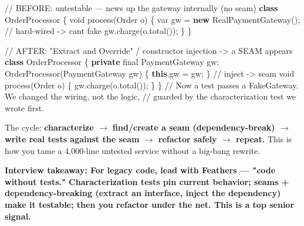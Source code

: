 \documentclass[11pt]{article}
\newenvironment{Shaded}{\begin{snugshade}}{\end{snugshade}}
\newcommand{\CommentTok}[1]{\textcolor[rgb]{0.48,0.49,0.49}{#1}}
\newcommand{\DataTypeTok}[1]{\textcolor[rgb]{0.16,0.50,0.73}{#1}}
\newcommand{\FunctionTok}[1]{\textcolor[rgb]{0.56,0.27,0.68}{#1}}
\newcommand{\KeywordTok}[1]{\textcolor[rgb]{0.81,0.81,0.76}{\textbf{#1}}}
\newcommand{\NormalTok}[1]{\textcolor[rgb]{0.81,0.81,0.76}{#1}}
\newcommand{\OperatorTok}[1]{\textcolor[rgb]{0.81,0.81,0.76}{#1}}
\begin{document}

\begin{Shaded}
\begin{Highlighting}[]
\CommentTok{// BEFORE: untestable — news up the gateway internally (no seam)}
\KeywordTok{class}\NormalTok{ OrderProcessor }\OperatorTok{\{}
    \DataTypeTok{void} \FunctionTok{process}\OperatorTok{(}\NormalTok{Order o}\OperatorTok{)} \OperatorTok{\{}
        \DataTypeTok{var}\NormalTok{ gw }\OperatorTok{=} \KeywordTok{new} \FunctionTok{RealPaymentGateway}\OperatorTok{();}   \CommentTok{// hard{-}wired {-}\textgreater{} can\textquotesingle{}t fake}
\NormalTok{        gw}\OperatorTok{.}\FunctionTok{charge}\OperatorTok{(}\NormalTok{o}\OperatorTok{.}\FunctionTok{total}\OperatorTok{());}
    \OperatorTok{\}}
\OperatorTok{\}}

\CommentTok{// AFTER: "Extract and Override" / constructor injection {-}\textgreater{} a SEAM appears}
\KeywordTok{class}\NormalTok{ OrderProcessor }\OperatorTok{\{}
    \KeywordTok{private} \DataTypeTok{final}\NormalTok{ PaymentGateway gw}\OperatorTok{;}
    \FunctionTok{OrderProcessor}\OperatorTok{(}\NormalTok{PaymentGateway gw}\OperatorTok{)} \OperatorTok{\{} \KeywordTok{this}\OperatorTok{.}\FunctionTok{gw} \OperatorTok{=}\NormalTok{ gw}\OperatorTok{;} \OperatorTok{\}}   \CommentTok{// inject {-}\textgreater{} seam}
    \DataTypeTok{void} \FunctionTok{process}\OperatorTok{(}\NormalTok{Order o}\OperatorTok{)} \OperatorTok{\{}\NormalTok{ gw}\OperatorTok{.}\FunctionTok{charge}\OperatorTok{(}\NormalTok{o}\OperatorTok{.}\FunctionTok{total}\OperatorTok{());} \OperatorTok{\}}
\OperatorTok{\}}
\CommentTok{// Now a test passes a FakeGateway. We changed the wiring, not the logic,}
\CommentTok{// guarded by the characterization test we wrote first.}
\end{Highlighting}
\end{Shaded}

The cycle: \textbf{characterize \(\rightarrow\) find/create a seam (dependency-break) \(\rightarrow\) write real tests against the seam \(\rightarrow\) refactor safely \(\rightarrow\) repeat.} This is how you tame a 4,000-line untested service without a big-bang rewrite.

\textbf{Interview takeaway: For legacy code, lead with Feathers --- "code without tests." Characterization tests pin current behavior; seams + dependency-breaking (extract an interface, inject the dependency) make it testable; then you refactor under the net. This is a top senior signal.}
\end{document}

